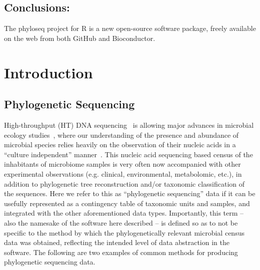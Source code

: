 \documentclass[10pt]{article}\usepackage{graphicx, color}
\newcommand{\R}{{\textsf{R}}}
\begin{document}
\subsection*{Conclusions:} 
The phyloseq project for \R{} is
a new open-source software package,
freely available on the web from both
GitHub and Bioconductor.



\clearpage
\section*{Introduction}

\subsection*{Phylogenetic Sequencing}
High-throughput (HT) DNA sequencing~\cite{Metzker:2010ew} 
is allowing major advances 
in microbial ecology studies~\cite{Hamady:2008iu},
where our understanding of the presence and abundance of microbial species
relies heavily on the observation of their nucleic acids
in a ``culture independent'' manner~\cite{Pace:1997tl}.
This nucleic acid sequencing based census of
the inhabitants of microbiome samples
is very often now accompanied with
other experimental observations
(e.g. clinical, environmental, metabolomic, etc.),
in addition to phylogenetic tree reconstruction
and/or taxonomic classification of the sequences. 
Here we refer to this as
``phylogenetic sequencing'' data
if it can be usefully represented as
a contingency table of taxonomic units and samples,
and integrated with the other aforementioned data types.
Importantly, this term -- 
also the namesake of the software here described --
is defined so as to not be specific to the method by which the
phylogenetically relevant microbial census data was obtained,
reflecting the intended level of data abstraction in the software.
The following are two examples of common methods
for producing phylogenetic sequencing data.
\end{document}
